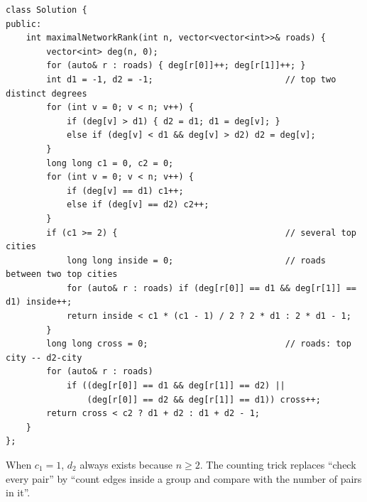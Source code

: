 \begin{alternativebox}
\begin{lstlisting}[style=cpp]
class Solution {
public:
    int maximalNetworkRank(int n, vector<vector<int>>& roads) {
        vector<int> deg(n, 0);
        for (auto& r : roads) { deg[r[0]]++; deg[r[1]]++; }
        int d1 = -1, d2 = -1;                          // top two distinct degrees
        for (int v = 0; v < n; v++) {
            if (deg[v] > d1) { d2 = d1; d1 = deg[v]; }
            else if (deg[v] < d1 && deg[v] > d2) d2 = deg[v];
        }
        long long c1 = 0, c2 = 0;
        for (int v = 0; v < n; v++) {
            if (deg[v] == d1) c1++;
            else if (deg[v] == d2) c2++;
        }
        if (c1 >= 2) {                                 // several top cities
            long long inside = 0;                      // roads between two top cities
            for (auto& r : roads) if (deg[r[0]] == d1 && deg[r[1]] == d1) inside++;
            return inside < c1 * (c1 - 1) / 2 ? 2 * d1 : 2 * d1 - 1;
        }
        long long cross = 0;                           // roads: top city -- d2-city
        for (auto& r : roads)
            if ((deg[r[0]] == d1 && deg[r[1]] == d2) ||
                (deg[r[0]] == d2 && deg[r[1]] == d1)) cross++;
        return cross < c2 ? d1 + d2 : d1 + d2 - 1;
    }
};
\end{lstlisting}
When $c_1 = 1$, $d_2$ always exists because $n \ge 2$. The counting trick replaces ``check every pair'' by ``count edges inside a group and compare with the number of pairs in it''.


\end{alternativebox}
